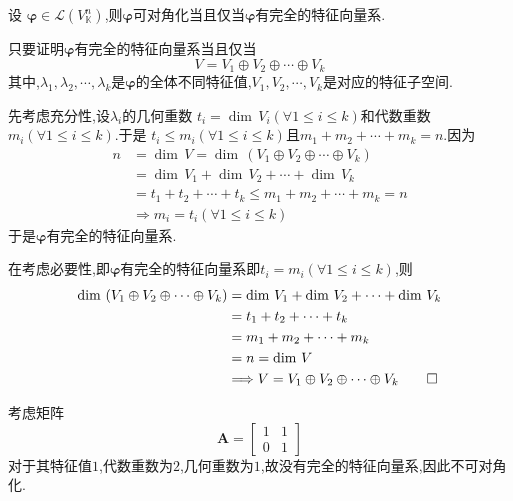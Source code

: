 \begin{formal}
\begin{theorem}[可对角化的条件]\label{thm:可对角化的条件2}
    设
    $\bm{\varphi}\in \mathcal{L}\left(
        V_{\mathbb{K}}^n
    \right)
    $,则$\bm{\varphi}$可对角化当且仅当$\bm{\varphi}$有完全的特征向量系.
\end{theorem}
\begin{Proof}
只要证明$\bm{\varphi}$有完全的特征向量系当且仅当
\[
V= V_1\oplus V_2\oplus\cdots\oplus V_k
\]
其中,$\lambda_1,\lambda_2,\cdots,\lambda_k$是$\bm{\varphi}$的全体不同特征值,$V_1,V_2,\cdots,V_k$是对应的特征子空间.

先考虑充分性,设$\lambda_i$的几何重数
$t_i=\dim\,V_i\left(
    \forall 1\leqslant i\leqslant k 
\right)$和代数重数$m_i\left(
    \forall 1\leqslant i\leqslant k
\right)$.于是
$t_i\leqslant m_i\left(
    \forall 1\leqslant i\leqslant k
\right)$且$m_1+m_2+\cdots+m_k=n.$因为
\begin{align*}
    n&=\dim\,V=\dim\,\left(
        V_1\oplus   V_2\oplus\cdots\oplus V_k
    \right)\\
    &=\dim\,V_1+\dim\,V_2+\cdots+\dim\,V_k\\
    &=t_1+t_2+\cdots+t_k\leqslant m_1+m_2+\cdots+m_k=n\\
    &\Longrightarrow 
    m_i=t_i\left(
        \forall 1\leqslant i\leqslant k
    \right)
\end{align*}
于是$\bm{\varphi}$有完全的特征向量系.

在考虑必要性,即$\bm{\varphi}$有完全的特征向量系即$t_i=m_i\left(
    \forall 1\leqslant i\leqslant k
\right)$,则
\begin{align*}
    \dim\,\left(
       V_1\oplus V_2\oplus\cdots\oplus V_k   
\right)&=\dim\,V_1+\dim\,V_2+\cdots+\dim\,V_k
\\
&=t_1+t_2+\cdots+t_k\\
&=m_1+m_2+\cdots+m_k\\
&=n=\dim\,V\\
&\Longrightarrow V=V_1\oplus V_2\oplus\cdots\oplus V_k\qedhere
\end{align*}
\end{Proof}
\end{formal}
\begin{brown}
\begin{example}
考虑矩阵
\newpage
\[
\bm{A}=\begin{bmatrix}
    1&1\\
    0&1
\end{bmatrix}
\]对于其特征值$1$,代数重数为$2$,几何重数为$1$,故没有完全的特征向量系,因此不可对角化.
\end{example}
\end{brown}
